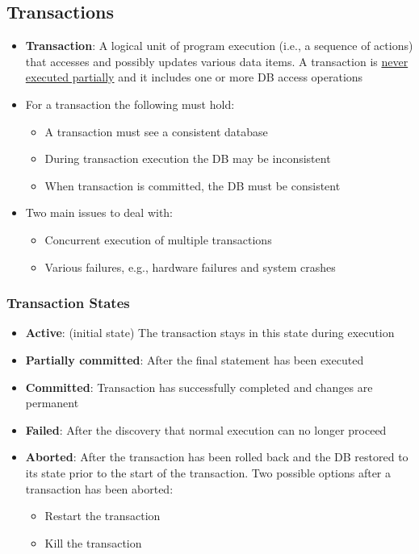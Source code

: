\subsection{Transactions}
\begin{itemize}[label=\(\rhd\)]
    \item \textbf{Transaction}: A logical unit of program execution (i.e., a sequence of actions) that accesses and possibly updates various data items. A transaction is \underline{never executed partially} and it includes one or more DB access operations
    \item For a transaction the following must hold: 
    \begin{itemize}[label=\(\rhd\)]
        \item A transaction must see a consistent database
        \item During transaction execution the DB may be inconsistent
        \item When transaction is committed, the DB must be consistent
    \end{itemize}
    \item Two main issues to deal with:
    \begin{itemize}[label=\(\rhd\)]
        \item Concurrent execution of multiple transactions
        \item Various failures, e.g., hardware failures and system crashes
    \end{itemize}
\end{itemize}

\subsubsection{Transaction States}
\begin{itemize}[label=\(\rhd\)]
    \item \textbf{Active}: (initial state) The transaction stays in this state during execution
    \item \textbf{Partially committed}: After the final statement has been executed
    \item \textbf{Committed}: Transaction has successfully completed and changes are permanent
    \item \textbf{Failed}: After the discovery that normal execution can no longer proceed 
    \item \textbf{Aborted}: After the transaction has been rolled back and the DB restored to its state prior to the start of the transaction. Two possible options after a transaction has been aborted:
    \begin{itemize}[label=\(\rhd\)]
        \item Restart the transaction
        \item Kill the transaction
    \end{itemize}
\end{itemize}


